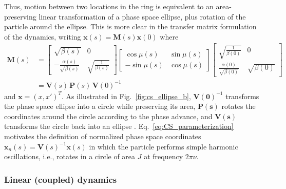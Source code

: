 Thus, motion between two locations in the ring is equivalent to an area-preserving linear transformation of a phase space ellipse, plus rotation of the particle around the ellipse. This is more clear in the transfer matrix formulation of the dynamics, writing $\mathbf{x}(s) = \mathbf{M}(s)\mathbf{x}(0)$ where
%
\begin{equation} \label{eq:CS_parameterization}
\begin{aligned}
    \mathbf{M}(s) &= 
    \begin{bmatrix} 
        \sqrt{\beta(s)} & 0 \\
        -\frac{\alpha(s)}{\sqrt{\beta(s)}} & \sqrt{\frac{1}{\beta(s)}}
    \end{bmatrix}
    \begin{bmatrix} 
        \cos\mu(s) & \sin\mu(s) 
        \\ -\sin\mu(s) & \cos\mu(s) 
    \end{bmatrix}
    \begin{bmatrix} 
        \sqrt{\frac{1}{\beta(0)}} & 0 \\
        \frac{\alpha(0)}{\sqrt{\beta(0)}} & \sqrt{\beta(0)}
    \end{bmatrix} \\
    &= \mathbf{V}(s) \, \mathbf{P}(s) \, \mathbf{V}(0)^{-1} 
\end{aligned}
\end{equation}
%
and $\mathbf{x} = (x, x')^T$. As illustrated in Fig.~\ref{fig:cs_ellipse_b}, $\mathbf{V(0)}^{-1}$ transforms the phase space ellipse into a circle while preserving its area, $\mathbf{P(s)}$ rotates the coordinates around the circle according to the phase advance, and $\mathbf{V(s)}$ transforms the circle back into an ellipse \cite{Lee2011}. Eq.~\eqref{eq:CS_parameterization} motivates the definition of normalized phase space coordinates $\mathbf{x}_n(s) = \mathbf{V}(s)^{-1} \mathbf{x}(s)$ in which the particle performs simple harmonic oscillations, i.e., rotates in a circle of area $J$ at frequency $2\pi\nu$. 




\subsubsection{Linear (coupled) dynamics}

